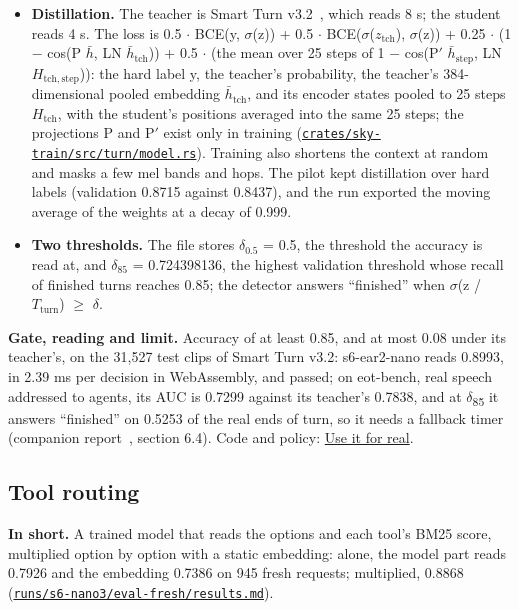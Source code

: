 \documentclass[10pt]{article}
\begin{document}
\begin{itemize}
\item \textbf{Distillation.} The teacher is Smart Turn v3.2~\cite{smartturn}, which reads 8 s; the student reads 4 s. The loss is 0.5 $\cdot$ BCE(y, $\sigma$(z)) + 0.5 $\cdot$ BCE($\sigma$($z_{\mathrm{tch}}$), $\sigma$(z)) + 0.25 $\cdot$ (1 $-$ cos(P $\bar h$, LN $\bar h_{\mathrm{tch}}$)) + 0.5 $\cdot$ (the mean over 25 steps of 1 $-$ cos(P$'$ $\bar h_{\mathrm{step}}$, LN $H_{\mathrm{tch,step}}$)): the hard label y, the teacher's probability, the teacher's 384-dimensional pooled embedding $\bar h_{\mathrm{tch}}$, and its encoder states pooled to 25 steps $H_{\mathrm{tch}}$, with the student's positions averaged into the same 25 steps; the projections P and P$'$ exist only in training (\href{https://github.com/maxgfr/skycmd/blob/main/crates/sky-train/src/turn/model.rs}{\texttt{crates/\allowbreak{}sky-train/\allowbreak{}src/\allowbreak{}turn/\allowbreak{}model.rs}}). Training also shortens the context at random and masks a few mel bands and hops. The pilot kept distillation over hard labels (validation 0.8715 against 0.8437), and the run exported the moving average of the weights at a decay of 0.999.
\item \textbf{Two thresholds.} The file stores $\delta_{0.5}$ = 0.5, the threshold the accuracy is read at, and $\delta_{85}$ = 0.724398136, the highest validation threshold whose recall of finished turns reaches 0.85; the detector answers ``finished'' when $\sigma$(z / $T_{\mathrm{turn}}$) $\geq$ $\delta$.
\end{itemize}

\textbf{Gate, reading and limit.} Accuracy of at least 0.85, and at most 0.08 under its teacher's, on the 31,527 test clips of Smart Turn v3.2: s6-ear2-nano reads 0.8993, in 2.39 ms per decision in WebAssembly, and passed; on eot-bench, real speech addressed to agents, its AUC is 0.7299 against its teacher's 0.7838, and at $\delta$\textsubscript{85} it answers ``finished'' on 0.5253 of the real ends of turn, so it needs a fallback timer (companion report~\cite{golfier2026skycmd}, section 6.4). Code and policy: \href{https://maxgfr.github.io/skycmd/use/\#end-of-turn}{Use it for real}.

\subsection{Tool routing}\label{sec:6.2}

\textbf{In short.} A trained model that reads the options and each tool's BM25 score, multiplied option by option with a static embedding: alone, the model part reads 0.7926 and the embedding 0.7386 on 945 fresh requests; multiplied, 0.8868 (\href{https://github.com/maxgfr/skycmd/blob/main/runs/s6-nano3/eval-fresh/results.md}{\texttt{runs/\allowbreak{}s6-nano3/\allowbreak{}eval-fresh/\allowbreak{}results.md}}).
\end{document}
